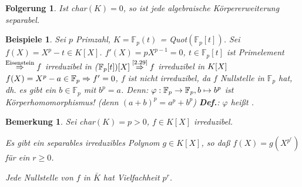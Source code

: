 \documentclass[a4paper,10pt,german]{scrbook}
\theoremstyle{saetze}
\theoremstyle{definitionen}
\newtheorem{Bem}[Def]{Bemerkung}
\newtheorem{Folg}[Def]{Folgerung}
\newtheorem{Bsp}[Def]{Beispiele}
\begin{document}
\begin{Folg}
Ist char$(K) = 0$, so ist jede algebraische
Körpererweiterung separabel.
\end{Folg}

\begin{Bsp}
Sei $p$ Primzahl, $K = \mathbb{F}_p(t)$ =
Quot$(\mathbb{F}_p[t])$. Sei $f(X) = X^p-t \in K[X]$.
\newline $f'(X) = pX^{p-1} = 0$, $t \in \mathbb{F}_p[t]$ ist Primelement
$\overset{\mbox{\scriptsize Eisenstein}}{\Rightarrow} f$ irreduzibel in
($\mathbb{F}_p[t])[X] \overset{\mbox{\scriptsize \ref{2.29}}}{\Rightarrow} f$
irreduzibel in $K[X]\\$
\newline $f(X) = X^p - a \in \mathbb{F}_p
\Rightarrow f' = 0$, $f$ ist nicht irreduzibel, da $f$ Nullstelle in
$\mathbb{F}_p$ hat, dh. es gibt ein $b \in \mathbb{F}_p$ mit $b^p =
a$.
\newline Denn: $\varphi: \mathbb{F}_p \rightarrow \mathbb{F}_p, b
\mapsto b^p$ ist Körperhomomorphismus! (denn $(a+b)^p = a^p + b^p$)
\newline \textbf{Def.}: $\varphi$ heißt .
\end{Bsp}

\begin{Bem}
Sei char$(K) = p > 0$, $f \in K[X]$
irreduzibel.

\begin{enum}
\label{3.16}
\item Es gibt ein separables irreduzibles Polynom $g \in K[X]$, so
daß $f(X) = g(X^{p^r})$ für ein $r \geq 0$.

\item Jede Nullstelle von $f$ in $\bar K$ hat Vielfachheit $p^r$.
\end{enum}
\end{Bem}
\end{document}
